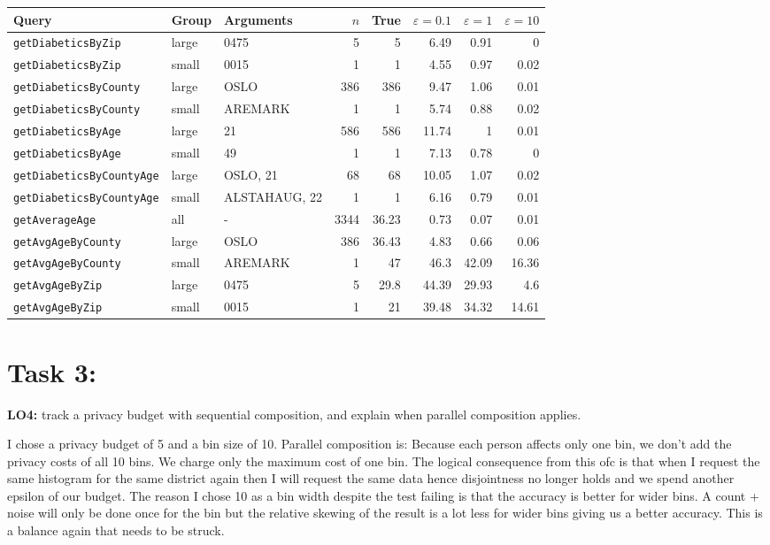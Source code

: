 \documentclass[11pt]{article}
\begin{document}
\begin{tabular}{lllrrrrr}
    \hline
    Query & Group & Arguments & $n$ & True & $\varepsilon=0.1$ & $\varepsilon=1$ & $\varepsilon=10$ \\
    \hline
    \texttt{getDiabeticsByZip} & large & 0475 & 5 & 5 & 6.49 & 0.91 & 0 \\
    \texttt{getDiabeticsByZip} & small & 0015 & 1 & 1 & 4.55 & 0.97 & 0.02 \\
    \texttt{getDiabeticsByCounty} & large & OSLO & 386 & 386 & 9.47 & 1.06 & 0.01 \\
    \texttt{getDiabeticsByCounty} & small & AREMARK & 1 & 1 & 5.74 & 0.88 & 0.02 \\
    \texttt{getDiabeticsByAge} & large & 21 & 586 & 586 & 11.74 & 1 & 0.01 \\
    \texttt{getDiabeticsByAge} & small & 49 & 1 & 1 & 7.13 & 0.78 & 0 \\
    \texttt{getDiabeticsByCountyAge} & large & OSLO, 21 & 68 & 68 & 10.05 & 1.07 & 0.02 \\
    \texttt{getDiabeticsByCountyAge} & small & ALSTAHAUG, 22 & 1 & 1 & 6.16 & 0.79 & 0.01 \\
    \texttt{getAverageAge} & all & - & 3344 & 36.23 & 0.73 & 0.07 & 0.01 \\
    \texttt{getAvgAgeByCounty} & large & OSLO & 386 & 36.43 & 4.83 & 0.66 & 0.06 \\
    \texttt{getAvgAgeByCounty} & small & AREMARK & 1 & 47 & 46.3 & 42.09 & 16.36 \\
    \texttt{getAvgAgeByZip} & large & 0475 & 5 & 29.8 & 44.39 & 29.93 & 4.6 \\
    \texttt{getAvgAgeByZip} & small & 0015 & 1 & 21 & 39.48 & 34.32 & 14.61 \\
    \hline
\end{tabular}

\section{Task 3:}
\textbf{LO4:} track a privacy budget with sequential composition, and explain when parallel composition applies.

I chose a privacy budget of 5 and a bin size of 10. Parallel composition is: Because each person affects only one bin, we don't add the privacy costs of all 10 bins. We charge only the maximum cost of one bin.
The logical consequence from this ofc is that when I request the same histogram for the same district again then I will request the same data hence disjointness no longer holds and we spend another epsilon of our budget.
The reason I chose 10 as a bin width despite the test failing is that the accuracy is better for wider bins. A count + noise will only be done once for the bin but the relative skewing of the result is a lot less for wider bins
giving us a better accuracy. This is a balance again that needs to be struck.
\end{document}
